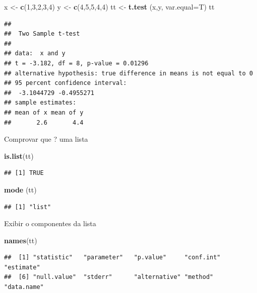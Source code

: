 \documentclass[]{book}
\newenvironment{Shaded}{\begin{snugshade}}{\end{snugshade}}
\newcommand{\DataTypeTok}[1]{\textcolor[rgb]{0.13,0.29,0.53}{#1}}
\newcommand{\DecValTok}[1]{\textcolor[rgb]{0.00,0.00,0.81}{#1}}
\newcommand{\KeywordTok}[1]{\textcolor[rgb]{0.13,0.29,0.53}{\textbf{#1}}}
\newcommand{\NormalTok}[1]{#1}
\newcommand{\StringTok}[1]{\textcolor[rgb]{0.31,0.60,0.02}{#1}}
\begin{document}
\begin{Shaded}
\begin{Highlighting}[]
\NormalTok{x <-}\StringTok{ }\KeywordTok{c}\NormalTok{(}\DecValTok{1}\NormalTok{,}\DecValTok{3}\NormalTok{,}\DecValTok{2}\NormalTok{,}\DecValTok{3}\NormalTok{,}\DecValTok{4}\NormalTok{)}
\NormalTok{y <-}\StringTok{ }\KeywordTok{c}\NormalTok{(}\DecValTok{4}\NormalTok{,}\DecValTok{5}\NormalTok{,}\DecValTok{5}\NormalTok{,}\DecValTok{4}\NormalTok{,}\DecValTok{4}\NormalTok{)}
\NormalTok{tt <-}\StringTok{ }\KeywordTok{t.test}\NormalTok{ (x,y, }\DataTypeTok{var.equal=}\NormalTok{T)}
\NormalTok{tt}
\end{Highlighting}
\end{Shaded}

\begin{verbatim}
## 
##  Two Sample t-test
## 
## data:  x and y
## t = -3.182, df = 8, p-value = 0.01296
## alternative hypothesis: true difference in means is not equal to 0
## 95 percent confidence interval:
##  -3.1044729 -0.4955271
## sample estimates:
## mean of x mean of y 
##       2.6       4.4
\end{verbatim}

Comprovar que ? uma lista

\begin{Shaded}
\begin{Highlighting}[]
\KeywordTok{is.list}\NormalTok{(tt)}
\end{Highlighting}
\end{Shaded}

\begin{verbatim}
## [1] TRUE
\end{verbatim}

\begin{Shaded}
\begin{Highlighting}[]
\KeywordTok{mode}\NormalTok{ (tt)}
\end{Highlighting}
\end{Shaded}

\begin{verbatim}
## [1] "list"
\end{verbatim}

Exibir o componentes da lista

\begin{Shaded}
\begin{Highlighting}[]
\KeywordTok{names}\NormalTok{(tt)}
\end{Highlighting}
\end{Shaded}

\begin{verbatim}
##  [1] "statistic"   "parameter"   "p.value"     "conf.int"    "estimate"   
##  [6] "null.value"  "stderr"      "alternative" "method"      "data.name"
\end{verbatim}
\end{document}

